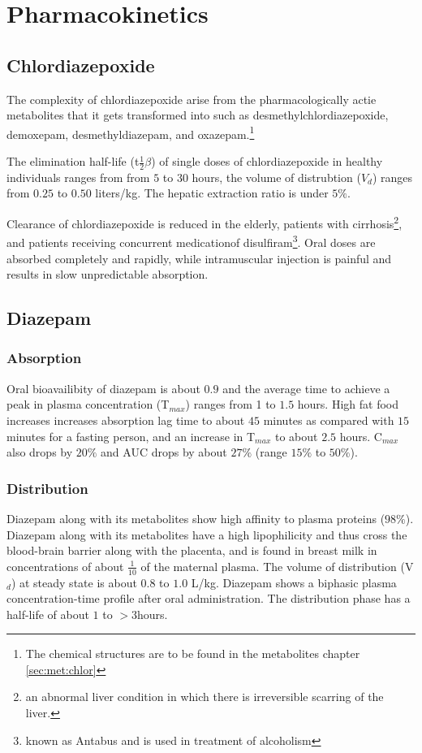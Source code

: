 \chapter{Pharmacokinetics}

\section{Chlordiazepoxide}
The complexity of chlordiazepoxide arise from the pharmacologically actie metabolites that it gets transformed into such as desmethylchlordiazepoxide, demoxepam, desmethyldiazepam, and oxazepam.\footnote{The chemical structures are to be found in the metabolites chapter \ref{sec:met:chlor}}

The elimination half-life (t$\frac{1}{2}\beta$) of single doses of chlordiazepoxide in healthy individuals ranges from from $5$ to $30$ hours, the volume of distrubtion ($V_d$) ranges from $0.25$ to $0.50$ liters/kg. The hepatic extraction ratio is under $5\%$.

Clearance of chlordiazepoxide is reduced in the elderly, patients with cirrhosis\footnote{an abnormal liver condition in which there is irreversible scarring of the liver.}, and patients receiving concurrent medicationof disulfiram\footnote{known as Antabus and is used in treatment of alcoholism}. Oral doses are absorbed completely and rapidly, while intramuscular injection is painful and results in slow unpredictable absorption.\cite{Greenblatt1978}  

\section{Diazepam}
\subsection{Absorption}
Oral bioavailibity of diazepam is about $0.9$ and the average time to achieve a peak in plasma concentration (T$_{max}$) ranges from 1 to $1.5$ hours. High fat food increases increases absorption lag time to about $45$ minutes as compared with $15$ minutes for a fasting person, and an increase in T$_{max}$ to about $2.5$ hours. C$_{max}$ also drops by $20\%$ and AUC drops by about $27\%$ (range $15\%$ to $50\%$).

\subsection{Distribution}
Diazepam along with its metabolites show high affinity to plasma proteins ($98\%$). Diazepam along with its metabolites have a high lipophilicity and thus cross the blood-brain barrier along with the placenta, and is found in breast milk in concentrations of about $\frac{1}{10}$ of the maternal plasma.
The volume of distribution (V$_d$) at steady state is about $0.8$ to $1.0$ L/kg. Diazepam shows a biphasic plasma concentration-time profile after oral administration. The  distribution phase has a half-life of about $1$ to $>3$hours.
